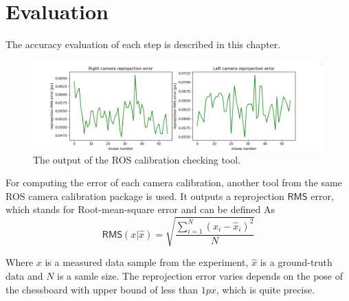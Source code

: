 \chapter{Evaluation}
\label{chapter:evaluation}

The accuracy evaluation of each step is described in this chapter.

\begin{figure}[h]
    \centering
    \includegraphics[width=\textwidth]{graphics/single_cam_calib.png}
    \caption{The output of the ROS calibration checking tool.}
    \label{fig:camcheck}
\end{figure}

For computing the error of each camera calibration, another tool from the same ROS camera calibration package is used.
It outputs a reprojection $\mathsf{RMS}$ error, which stands for Root-mean-square error and can be defined As
\begin{equation}
    \mathsf{RMS}(x | \hat{x} ) = \sqrt{\frac{\sum_{i=1}^{N}{(x_i - \hat{x}_i)^2}}{N}}
\end{equation}

Where $x$ is a measured data sample from the experiment, $\hat{x}$ is a ground-truth data and $N$ is a samle size.
The reprojection error varies depends on the pose of the chessboard with upper bound of less than $1px$, which is quite precise.
